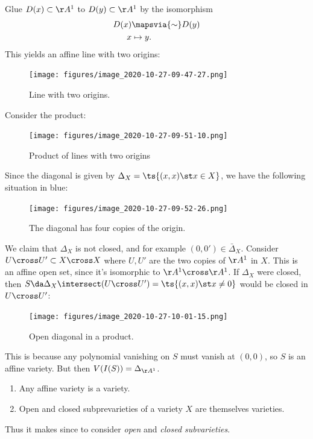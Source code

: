 \begin{example}

Glue \(D(x) \subset \AA^1\) to \(D(y) \subset \AA^1\) by the isomorphism
\begin{align*}  
D(x) & \mapsvia{\sim} D(y) \\
x &\mapsto y
.\end{align*} This yields an affine line with two origins:

\begin{figure}
\centering
\texttt{[image: figures/image\_2020-10-27-09-47-27.png]}
\caption{Line with two origins.}
\end{figure}

Consider the product:

\begin{figure}
\centering
\texttt{[image: figures/image\_2020-10-27-09-51-10.png]}
\caption{Product of lines with two origins}
\end{figure}

Since the diagonal is given by \(\Delta_X = \ts{(x, x) \st x\in X}\), we
have the following situation in blue:

\begin{figure}
\centering
\texttt{[image: figures/image\_2020-10-27-09-52-26.png]}
\caption{The diagonal has four copies of the origin.}
\end{figure}

We claim that \(\Delta_X\) is not closed, and for example
\((0, 0') \in \bar{\Delta}_X\). Consider
\(U\cross U' \subset X\cross X\) where \(U, U'\) are the two copies of
\(\AA^1\) in \(X\). This is an affine open set, since it's isomorphic to
\(\AA^1\cross \AA^1\). If \(\Delta_X\) were closed, then
\(S \da \Delta_X \intersect (U\cross U') = \ts{(x, x) \st x\neq 0}\)
would be closed in \(U\cross U'\):

\begin{figure}
\centering
\texttt{[image: figures/image\_2020-10-27-10-01-15.png]}
\caption{Open diagonal in a product.}
\end{figure}

This is because any polynomial vanishing on \(S\) must vanish at
\((0, 0)\), so \(S\) is an affine variety. But then
\(V(I(S)) = \Delta_{\AA^1}\).

\end{example}

\begin{lemma}

\envlist

\begin{enumerate}
\def\labelenumi{\alph{enumi}.}
\item
  Any affine variety is a variety.
\item
  Open and closed subprevarieties of a variety \(X\) are themselves
  varieties.
\end{enumerate}

Thus it makes since to consider \emph{open} and \emph{closed
subvarieties}.

\end{lemma}

